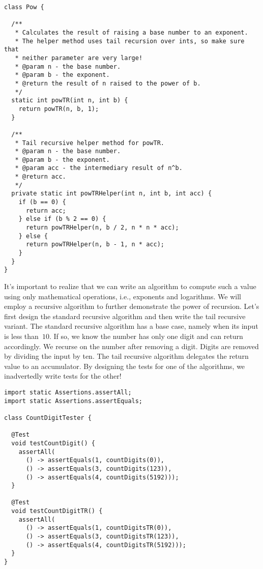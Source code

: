 \begin{lstlisting}[language=MyJava]
class Pow {

  /**
   * Calculates the result of raising a base number to an exponent.
   * The helper method uses tail recursion over ints, so make sure that
   * neither parameter are very large!
   * @param n - the base number.
   * @param b - the exponent.
   * @return the result of n raised to the power of b.
   */
  static int powTR(int n, int b) {
    return powTR(n, b, 1);
  }

  /**
   * Tail recursive helper method for powTR.
   * @param n - the base number.
   * @param b - the exponent.
   * @param acc - the intermediary result of n^b.
   * @return acc.
   */
  private static int powTRHelper(int n, int b, int acc) {
    if (b == 0) { 
      return acc; 
    } else if (b % 2 == 0) {
      return powTRHelper(n, b / 2, n * n * acc);
    } else {
      return powTRHelper(n, b - 1, n * acc);
    }
  }
}
\end{lstlisting}

It's important to realize that we can write an algorithm to compute such a value using only mathematical operations, i.e., exponents and logarithms.
We will employ a recursive algorithm to further demonstrate the power of recursion.
Let's first design the standard recursive algorithm and then write the tail recursive variant.
The standard recursive algorithm has a base case, namely when its input is less than~$10$. If so, we know the number has only one digit and can return accordingly.
We recurse on the number after removing a digit.
Digits are removed by dividing the input by ten.
The tail recursive algorithm delegates the return value to an accumulator.
By designing the tests for one of the algorithms, we inadvertedly write tests for the other!

\begin{lstlisting}[language=MyJava]
import static Assertions.assertAll;
import static Assertions.assertEquals;

class CountDigitTester {

  @Test
  void testCountDigit() {
    assertAll(
      () -> assertEquals(1, countDigits(0)),
      () -> assertEquals(3, countDigits(123)),
      () -> assertEquals(4, countDigits(5192)));
  }

  @Test
  void testCountDigitTR() {
    assertAll(
      () -> assertEquals(1, countDigitsTR(0)),
      () -> assertEquals(3, countDigitsTR(123)),
      () -> assertEquals(4, countDigitsTR(5192)));
  }
}
\end{lstlisting}

